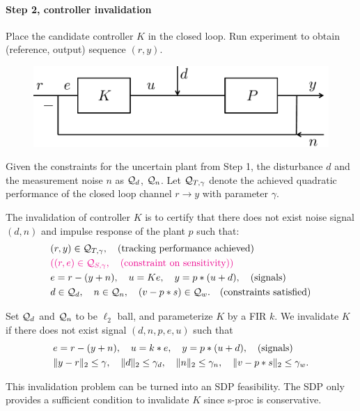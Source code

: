 \documentclass[11pt, onecolumn]{article}
\newcommand{\qq}[1]{{\color{magenta}{(#1)}}}
\begin{document}
\paragraph{Step 2, controller invalidation}

Place the candidate controller $K$ in the closed loop. Run experiment to obtain (reference, output)
sequence $(r, y)$.
\begin{figure}[!ht]
  \centering
  \includegraphics[width=.5\linewidth]{sys2.pdf}
\end{figure}

Given the constraints for the uncertain plant from Step 1, the disturbance $d$ and the measurement
noise $n$ as $\mathcal Q_d$, $\mathcal Q_n$. Let $\mathcal Q_{T,\gamma}$ denote the achieved quadratic performance
of the closed loop channel $r\to y$ with parameter $\gamma$.

The invalidation of controller $K$ is to certify that there does not exist noise signal $(d, n)$ and
impulse response of the plant $p$ such that:
\begin{align*}
  & (r,y)\in\mc Q_{T,\gamma}, \quad\tx{(tracking performance achieved)}
  \\
 &  \qq{ (r, e)\in\mc Q_{S,\gamma}, \quad \tx{(constraint on sensitivity)}}
  \\
  & e = r-(y+n), \quad u = K e, \quad y = p * (u+d),  \quad\tx{(signals)}
  \\
  & d\in\mc Q_d, \quad n\in\mc Q_n,  \quad (v-p*s )\in\mc Q_w. \quad\tx{(constraints satisfied)}
\end{align*}

Set $\mathcal Q_d$ and $\mathcal Q_n$ to be $\ell_2$ ball, and parameterize $K$ by a FIR $k$.  We invalidate $K$
if there does not exist signal $(d, n, p, e, u)$ such that
\begin{align*}
  & e = r-(y+n), \quad u = k * e, \quad y = p * (u+d), \quad\text{(signals)}
  \\
  & \|y - r\|_2 \le \gamma, \quad \|d\|_2\le \gamma_d, \quad  \|n\|_2\le \gamma_n, \quad
  \|v-p*s\|_2\le \gamma_w.
\end{align*}

This invalidation problem can be turned into an SDP feasibility.  The SDP only provides a sufficient
condition to invalidate $K$ since s-proc is conservative.
\end{document}
